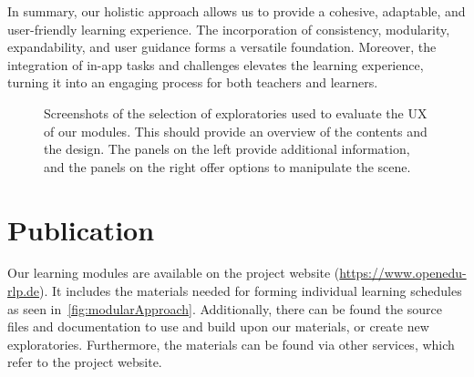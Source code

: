 In summary, our holistic approach allows us to provide a cohesive, adaptable, and user-friendly learning experience. The incorporation of consistency, modularity, expandability, and user guidance forms a versatile foundation. Moreover, the integration of in-app tasks and challenges elevates the learning experience, turning it into an engaging process for both teachers and learners.
\begin{figure}[t!b]
	\centering
	\captionsetup{labelfont=bf,textfont=it}
	\caption{Screenshots of the selection of exploratories used to evaluate the UX of our modules. This should provide an overview of the contents and the design. The panels on the left provide additional information, and the panels on the right offer options to manipulate the scene.}
	\label{fig:uxEval}
\end{figure}
\section{Publication\label{sec:publication}}
Our learning modules are available on the project website (\href{https://openedu-rlp.de/edu-sharing/components/collections?id=fd3957ef-80aa-4440-8956-c1d0d738c629}{https://www.openedu-rlp.de}). It includes the materials needed for forming individual learning schedules as seen in~\autoref{fig:modularApproach}. Additionally, there can be found the source files and documentation to use and build upon our materials, or create new exploratories. Furthermore, the materials can be found via other services, which refer to the project website. %

